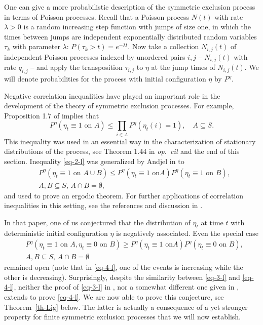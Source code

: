 \documentclass[10pt,reqno]{amsart}
\theoremstyle{plain}
\theoremstyle{definition}
\theoremstyle{remark}
\begin{document}
One can give a more probabilistic description of the symmetric exclusion 
process in
terms of Poisson processes.
Recall that a Poisson process $N(t)$ with rate $\lambda>0$ is a random 
increasing step
function with jumps of size one, in which the times between jumps are 
independent
exponentially
distributed random variables $\tau_k$ with parameter $\lambda$:
$P(\tau_k>t)=e^{-\lambda t}$.
Now take a collection $N_{i,j}(t)$ of independent Poisson processes indexed by
unordered pairs $i,j$ --
$N_{i,j}(t)$ with rate $q_{i,j}$ -- and apply the transposition 
$\tau_{i,j}$ to
$\eta$ at the jump times of
$N_{i,j}(t)$. We will denote probabilities for the process with initial
configuration $\eta$ by $P^{\eta}$.

Negative correlation inequalities have played an important role in the
development of the theory of symmetric exclusion processes. For example,
Proposition 1.7 of \cite[Chap.~VIII]{L0} implies that
\begin{equation}\label{eq-2-l}
P^{\eta}(\eta_t\equiv 1 \text{ on } A)\leq\prod_{i\in
A}P^{\eta}(\eta_t(i)=1),\quad A\subseteq S.
\end{equation}
This inequality was used in an essential way in the characterization of 
stationary distributions
of the process, see Theorem 1.44 in {\em op.~cit} and the end of
this section. Inequality 
\eqref{eq-2-l} was generalized by Andjel in \cite{An} to
\begin{equation}\label{eq-3-l}
\begin{split}
&P^{\eta}(\eta_t\equiv 1\text{ on }A\cup B)\leq P^{\eta}(\eta_t\equiv 1
\text{ on
}A)P^{\eta}(\eta_t\equiv
1\text{ on } B),\\ 
&A,B\subseteq S,\, A\cap B=\emptyset,
\end{split}
\end{equation}
and used to prove an ergodic theorem. For further applications of correlation
inequalities in this
setting, see the references and discussion in \cite{L2}.

In that paper, one of us conjectured that the distribution of $\eta_t$ at 
time $t$ with deterministic initial configuration
$\eta$ is negatively associated. Even the special case
\begin{equation}\label{eq-4-l}
\begin{split}
&P^{\eta}(\eta_t\equiv 1\text{ on }A,\eta_t\equiv 0\text{ on }B)\geq
P^{\eta}(\eta_t\equiv 1\text{ on
}A)P^{\eta}(\eta_t\equiv 0\text{ on } B),\\ 
&A,B\subseteq S,\,A\cap B=\emptyset
\end{split}
\end{equation}
remained open (note that in \eqref{eq-4-l}, one of the events is increasing
while the other is decreasing). 
Surprisingly, despite the similarity between \eqref{eq-3-l} and 
\eqref{eq-4-l}, 
neither the proof of \eqref{eq-3-l} in \cite{An}, nor a somewhat
different one given in \cite{L2}, extends to prove \eqref{eq-4-l}. 
We are now able to prove this conjecture, see Theorem~\ref{th-Lig} below. 
The latter is actually a consequence of a yet stronger property for finite
 symmetric exclusion processes that we will now establish.
\end{document}
